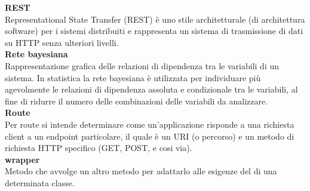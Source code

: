 \textbf{REST}\-\\
Representational State Transfer (REST) è uno stile architetturale (di architettura software) per i sistemi distribuiti e rappresenta un sistema di trasmissione di dati su HTTP senza ulteriori livelli.
\-\\

\textbf{Rete bayesiana}\-\\
Rappresentazione grafica delle relazioni di dipendenza tra le variabili di un sistema. In statistica la rete bayesiana è utilizzata per individuare più agevolmente le relazioni di dipendenza assoluta e condizionale tra le variabili, al fine di ridurre il numero delle combinazioni delle variabili da analizzare.
\-\\

\textbf{Route}\-\\
Per route si intende determinare come un'applicazione risponde a una richiesta client a un 
endpoint particolare, il quale è un URI (o percorso) e un metodo di richiesta HTTP specifico (GET, POST, e cosi via).
\-\\

\textbf{wrapper}\-\\
Metodo che avvolge un altro metodo per adattarlo alle esigenze del di una determinata classe.
\-\\